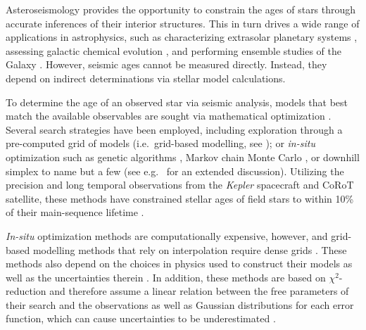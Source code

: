 \documentclass[manuscript]{aastex}
\begin{document}
Asteroseismology provides the opportunity to constrain the ages of stars through accurate inferences of their interior structures.  This in turn drives a wide range of applications in astrophysics, such as characterizing extrasolar planetary systems \citep[e.g.][]{2015ApJ...799..170C,2015MNRAS.452.2127S}, assessing galactic chemical evolution \citep[e.g.][]{2015ASSP...39..111C}, and performing ensemble studies of the Galaxy \citep[e.g.][]{2011Sci...332..213C, 2013MNRAS.429..423M, 2014ApJS..210....1C}. However, seismic ages cannot be measured directly. Instead, they depend on indirect determinations via stellar model calculations. 

To determine the age of an observed star via seismic analysis, models that best match the available observables are sought via mathematical optimization \citep{1994ApJ...427.1013B}. Several search strategies have been employed, including exploration through a pre-computed grid of models (i.e.~grid-based modelling, see \citealt{2011ApJ...730...63G, 2014ApJS..210....1C}); or \emph{in-situ} optimization such as genetic algorithms \citep{2014ApJS..214...27M}, Markov chain Monte Carlo \citep{2012MNRAS.427.1847B}, or downhill simplex \citep{2013ApJS..208....4P} to name but a few (see e.g.~\citealt{2015MNRAS.452.2127S} for an extended discussion). %
Utilizing the precision and long temporal observations from the \emph{Kepler} spacecraft and CoRoT satellite, these methods have constrained stellar ages of field stars to within 10\% of their main-sequence lifetime \citep{2015MNRAS.452.2127S}. 

\emph{In-situ} optimization methods are computationally expensive, however, and grid-based modelling methods that rely on interpolation require dense grids \citep{2009ApJ...699..373M}. These methods also depend on the choices in physics used to construct their models as well as the uncertainties therein \citep{2014A&A...569A..21L}. In addition, these methods are based on $\chi^2$-reduction and therefore assume a linear relation between the free parameters of their search and the observations as well as Gaussian distributions for each error function, which can cause uncertainties to be underestimated \citep{2010arXiv1012.3754A}.
\end{document}
